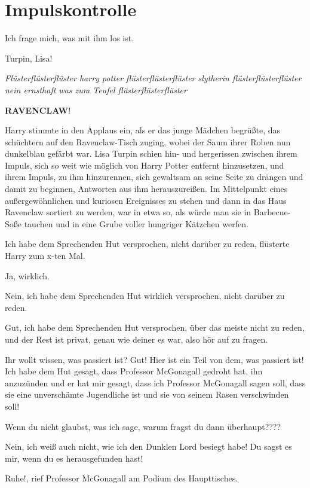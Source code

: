 \chapter{Impulskontrolle}

\loq Ich frage mich, was mit ihm los ist.\grqq{}

\glqq{}Turpin, Lisa!\grqq{}

\emph{Flüsterflüsterflüster harry potter flüsterflüsterflüster slytherin
flüsterflüsterflüster nein ernsthaft was zum Teufel flüsterflüsterflüster}

\glqq{}\textbf{RAVENCLAW}!\grqq{}

Harry stimmte in den Applaus ein, als er das junge Mädchen begrüßte, das
schüchtern auf den Ravenclaw-Tisch zuging, wobei der Saum ihrer Roben nun
dunkelblau gefärbt war. Lisa Turpin schien hin- und hergerissen zwischen ihrem
Impuls, sich so weit wie möglich von Harry Potter entfernt hinzusetzen, und
ihrem Impuls, zu ihm hinzurennen, sich gewaltsam an seine Seite zu drängen und
damit zu beginnen, Antworten aus ihm herauszureißen. Im Mittelpunkt eines
außergewöhnlichen und kuriosen Ereignisses zu stehen und dann in das Haus
Ravenclaw sortiert zu werden, war in etwa so, als würde man sie in Barbecue-Soße
tauchen und in eine Grube voller hungriger Kätzchen werfen.

\glqq{}Ich habe dem Sprechenden Hut versprochen, nicht darüber zu reden\grqq{},
flüsterte Harry zum x-ten Mal.

\glqq{}Ja, wirklich.\grqq{}

\glqq{}Nein, ich habe dem Sprechenden Hut wirklich versprochen, nicht darüber zu
reden.\grqq{}

\glqq{}Gut, ich habe dem Sprechenden Hut versprochen, über das meiste nicht zu
reden, und der Rest ist privat, genau wie deiner es war, also hör auf zu
fragen.\grqq{}

\glqq{}Ihr wollt wissen, was passiert ist? Gut! Hier ist ein Teil von dem, was
passiert ist! Ich habe dem Hut gesagt, dass Professor McGonagall gedroht hat,
ihn anzuzünden und er hat mir gesagt, dass ich Professor McGonagall sagen soll,
dass sie eine unverschämte Jugendliche ist und sie von seinem Rasen verschwinden
soll!\grqq{}

\glqq{}Wenn du nicht glaubst, was ich sage, warum fragst du dann
überhaupt????\grqq{}

\glqq{}Nein, ich weiß auch nicht, wie ich den Dunklen Lord besiegt habe! Du
sagst es mir, wenn du es herausgefunden hast!\grqq{}

\glqq{}Ruhe!\grqq{}, rief Professor McGonagall am Podium des Haupttisches.


